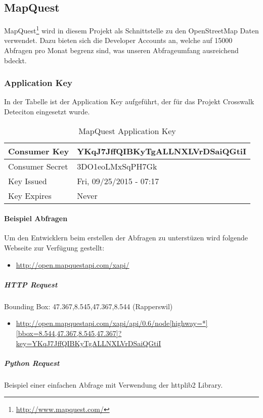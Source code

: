\subsection{MapQuest}
MapQuest\footnote{\url{http://www.mapquest.com/}} wird in diesem Projekt als Schnittstelle zu den OpenStreetMap Daten verwendet. Dazu bieten sich die Developer Accounts an, welche auf 15000 Abfragen pro Monat begrenz sind, was unseren Abfrageumfang ausreichend bdeckt.

\subsubsection{Application Key}
In der Tabelle ist der Application Key aufgeführt, der für das Projekt Crosswalk Deteciton eingesetzt wurde.
\begin{table}
    \begin{tabular}{ | p{6cm} | p{6cm}  | }
    \hline    
	Consumer Key &  YKqJ7JffQIBKyTgALLNXLVrDSaiQGtiI \\ \hline
	Consumer Secret & 3DO1eoLMxSqPH7Gk \\ \hline
	Key Issued & Fri, 09/25/2015 - 07:17 \\ \hline
	Key Expires & Never \\ \hline
    \end{tabular}
    \caption[MapQuest Application Key]{MapQuest Application Key}
\end{table}

\paragraph{Beispiel Abfragen}
Um den Entwicklern beim erstellen der Abfragen zu unterstüzen wird folgende Webseite zur Verfügung gestellt:
\begin{itemize}
	\item \url{http://open.mapquestapi.com/xapi/}
\end{itemize}

\subparagraph{HTTP Request}
Bounding Box:  47.367,8.545,47.367,8.544 (Rapperswil)
\begin{itemize}
	\item \url{http://open.mapquestapi.com/xapi/api/0.6/node[highway=*][bbox=8.544,47.367,8.545,47.367]?key=YKqJ7JffQIBKyTgALLNXLVrDSaiQGtiI}
\end{itemize}

\subparagraph{Python Request} Beispiel einer einfachen Abfrage mit Verwendung der httplib2 Library. \\ 

\begin{python}
import httplib2

url =  'http://open.mapquestapi.com/xapi/api/0.6/node
		[highway=*][bbox=8.544,47.367,8.545,47.367]?
		key=YKqJ7JffQIBKyTgALLNXLVrDSaiQGtiI}'
resp, content = httplib2.Http().request(url)
\end{python}










